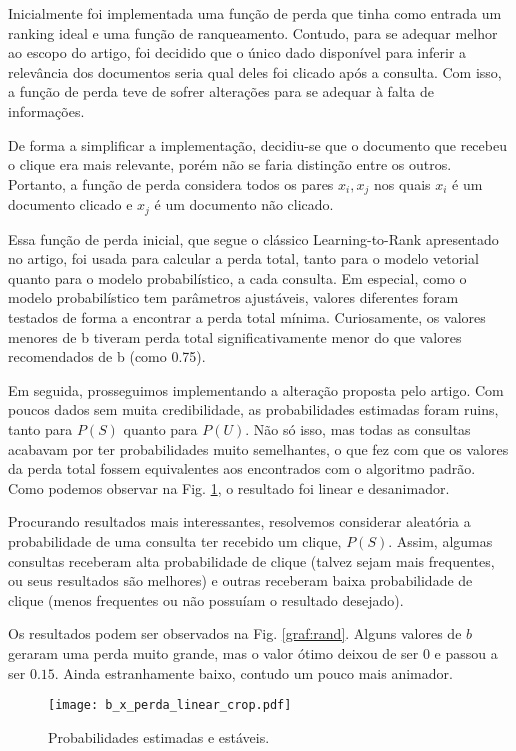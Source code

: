 \documentclass{svproc}
\begin{document}
Inicialmente foi implementada uma função de perda que tinha como entrada um ranking ideal e uma função de ranqueamento.
Contudo, para se adequar melhor ao escopo do artigo, foi decidido que o único dado disponível para inferir a relevância dos
documentos seria qual deles foi clicado após a consulta. Com isso, a função de perda teve de sofrer alterações para se 
adequar à falta de informações.

De forma a simplificar a implementação, decidiu-se que o documento que recebeu o clique era mais relevante, porém não se 
faria distinção entre os outros. Portanto, a função de perda considera todos os pares $x_i, x_j$ nos quais $x_i$ é um 
documento clicado e $x_j$ é um documento não clicado.

Essa função de perda inicial, que segue o clássico Learning-to-Rank apresentado no artigo, foi usada para 
calcular a perda total, tanto para o modelo vetorial quanto para o modelo probabilístico, a cada consulta. 
Em especial, como o modelo probabilístico tem parâmetros ajustáveis, valores diferentes foram testados de forma
a encontrar a perda total mínima. Curiosamente, os valores menores de b tiveram perda total significativamente menor do que
valores recomendados de b (como 0.75).

Em seguida, prosseguimos implementando a alteração proposta pelo artigo. Com poucos dados sem muita credibilidade, as
probabilidades estimadas foram ruins, tanto para $P(S)$ quanto para $P(U)$. Não só isso, mas todas as consultas acabavam
por ter probabilidades muito semelhantes, o que fez com que os valores da perda total fossem equivalentes aos encontrados
com o algoritmo padrão. Como podemos observar na Fig. \ref{graf:linear}, o resultado foi linear e desanimador.

Procurando resultados mais interessantes, resolvemos considerar aleatória a probabilidade de uma consulta ter recebido um
clique, $P(S)$. Assim, algumas consultas receberam alta probabilidade de clique (talvez sejam mais frequentes, ou seus 
resultados são melhores) e outras receberam baixa probabilidade de clique (menos frequentes ou não possuíam o resultado 
desejado).

Os resultados podem ser observados na Fig. \ref{graf:rand}. Alguns valores de $b$ geraram uma perda muito grande, mas o 
valor ótimo deixou de ser $0$ e passou a ser $0.15$. Ainda estranhamente baixo, contudo um pouco mais animador.


\newpage

\begin{figure}[ht]
  \caption{Probabilidades estimadas e estáveis.}
  \label{graf:linear}
  \centering
  \texttt{[image: b\_x\_perda\_linear\_crop.pdf]}
\end{figure}
\end{document}
